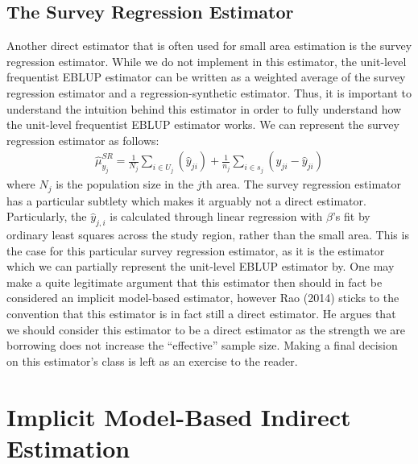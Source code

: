 \documentclass[12pt,twoside]{reedthesis}
\begin{document}
\hypertarget{the-survey-regression-estimator}{%
\subsection{The Survey Regression Estimator}\label{the-survey-regression-estimator}}

Another direct estimator that is often used for small area estimation is the survey regression estimator. While we do not implement in this estimator, the unit-level frequentist EBLUP estimator can be written as a weighted average of the survey regression estimator and a regression-synthetic estimator. Thus, it is important to understand the intuition behind this estimator in order to fully understand how the unit-level frequentist EBLUP estimator works. We can represent the survey regression estimator as follows:
\begin{align}
\hat \mu_{y_j}^{SR} = \frac{1}{N_j} \sum_{i \in U_j} (\hat y_{ji}) +
\frac{1}{n_j} \sum_{i \in s_j} (y_{ji} - \hat y_{ji})
\end{align}
where \(N_j\) is the population size in the \(j\)th area. The survey regression estimator has a particular subtlety which makes it arguably not a direct estimator. Particularly, the \(\hat y_{j,i}\) is calculated through linear regression with \(\beta\)'s fit by ordinary least squares across the study region, rather than the small area. This is the case for this particular survey regression estimator, as it is the estimator which we can partially represent the unit-level EBLUP estimator by. One may make a quite legitimate argument that this estimator then should in fact be considered an implicit model-based estimator, however Rao (2014) sticks to the convention that this estimator is in fact still a direct estimator. He argues that we should consider this estimator to be a direct estimator as the strength we are borrowing does not increase the ``effective'' sample size. Making a final decision on this estimator's class is left as an exercise to the reader.

\hypertarget{implicit-model-based-indirect-estimation}{%
\section{Implicit Model-Based Indirect Estimation}\label{implicit-model-based-indirect-estimation}}
\end{document}
